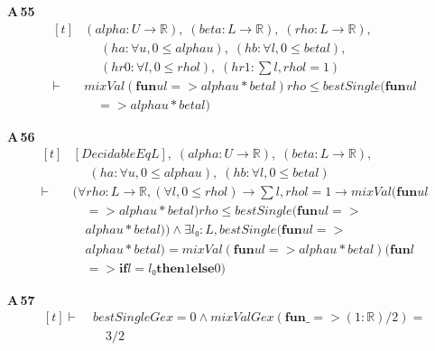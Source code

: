 \noindent\textbf{A\,55}\quad{}
{\footnotesize\[ \begin{aligned}[t]
&(\mathit{alpha} : \mathit{U} \to \mathbb{R} ),\; (\mathit{beta} : \mathit{L} \to \mathbb{R} ),\; (\mathit{rho} : \mathit{L} \to \mathbb{R} ),\\
&\quad \; (\mathit{ha} : \forall \mathit{u}, 0 \leq \mathit{alpha} \mathit{u}),\; (\mathit{hb} : \forall \mathit{l}, 0 \leq \mathit{beta} \mathit{l}),\\
&\quad \; (\mathit{hr0} : \forall \mathit{l}, 0 \leq \mathit{rho} \mathit{l}),\; (\mathit{hr1} : \textstyle\sum \mathit{l}, \mathit{rho} \mathit{l} = 1)\\
\vdash\;&\mathit{mixVal} (\mathbf{fun} \mathit{u} \mathit{l} => \mathit{alpha} \mathit{u} * \mathit{beta} \mathit{l}) \mathit{rho} \leq \mathit{bestSingle} (\mathbf{fun} \mathit{u} \mathit{l}\\
&\quad => \mathit{alpha} \mathit{u} * \mathit{beta} \mathit{l})
\end{aligned} \]}

\noindent\textbf{A\,56}\quad{}
{\footnotesize\[ \begin{aligned}[t]
&[\mathit{DecidableEq} \mathit{L}],\; (\mathit{alpha} : \mathit{U} \to \mathbb{R} ),\; (\mathit{beta} : \mathit{L} \to \mathbb{R} ),\\
&\quad \; (\mathit{ha} : \forall \mathit{u}, 0 \leq \mathit{alpha} \mathit{u}),\; (\mathit{hb} : \forall \mathit{l}, 0 \leq \mathit{beta} \mathit{l})\\
\vdash\;&(\forall \mathit{rho} : \mathit{L} \to \mathbb{R} , (\forall \mathit{l}, 0 \leq \mathit{rho} \mathit{l}) \to \textstyle\sum \mathit{l}, \mathit{rho} \mathit{l} = 1 \to \mathit{mixVal} (\mathbf{fun} \mathit{u} \mathit{l}\\
&\quad => \mathit{alpha} \mathit{u} * \mathit{beta} \mathit{l}) \mathit{rho} \leq \mathit{bestSingle} (\mathbf{fun} \mathit{u} \mathit{l} =>\\
&\quad \mathit{alpha} \mathit{u} * \mathit{beta} \mathit{l})) \wedge \exists \mathit{l₀} : \mathit{L}, \mathit{bestSingle} (\mathbf{fun} \mathit{u} \mathit{l} =>\\
&\quad \mathit{alpha} \mathit{u} * \mathit{beta} \mathit{l}) = \mathit{mixVal} (\mathbf{fun} \mathit{u} \mathit{l} => \mathit{alpha} \mathit{u} * \mathit{beta} \mathit{l}) (\mathbf{fun} \mathit{l}\\
&\quad => \mathbf{if} \mathit{l} = \mathit{l₀} \mathbf{then} 1 \mathbf{else} 0)
\end{aligned} \]}

\noindent\textbf{A\,57}\quad{}
{\footnotesize\[ \begin{aligned}[t]
\vdash\;&\mathit{bestSingle} \mathit{Gex} = 0 \wedge \mathit{mixVal} \mathit{Gex} (\mathbf{fun} \mathit{\_} => (1 : \mathbb{R} ) / 2) =\\
&\quad 3 / 2
\end{aligned} \]}
